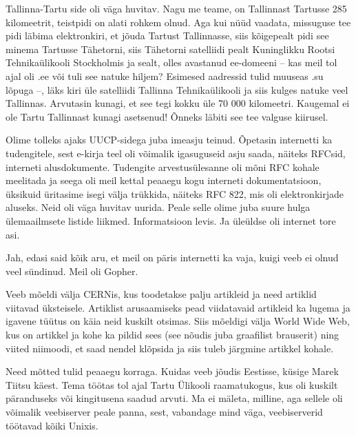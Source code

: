 Tallinna-Tartu side oli väga huvitav. Nagu me teame, on Tallinnast Tartusse 285 kilomeetrit, teistpidi on alati rohkem olnud. Aga kui 
nüüd vaadata, missuguse tee pidi läbima elektronkiri, et jõuda Tartust 
Tallinnasse, siis kõigepealt pidi see minema Tartusse Tähetorni, siis Tähetorni 
satelliidi pealt Kuninglikku Rootsi Tehnikaülikooli Stockholmis ja sealt, olles 
avastanud ee-domeeni – kas meil tol ajal oli .ee või tuli see natuke hiljem? 
Esimesed aadressid tulid muuseas .su lõpuga –, läks kiri üle satelliidi 
Tallinna Tehnikaülikooli ja siis kulges natuke veel Tallinnas. Arvutasin kunagi, et see tegi
kokku üle 70 000 kilomeetri\label{sisu!70k}. Kaugemal ei ole Tartu 
Tallinnast kunagi asetsenud! Õnneks läbiti see tee valguse kiirusel. 


Olime tolleks ajaks UUCP-sidega juba imeasju teinud. 
Õpetasin internetti ka tudengitele, sest e-kirja teel oli 
võimalik igasuguseid asju saada, näiteks RFCsid, interneti 
alusdokumente. Tudengite 
arvestusülesanne oli mõni RFC kohale meelitada ja seega oli meil kettal 
peaaegu kogu interneti dokumentatsioon, üksikuid üritasime isegi 
välja trükkida, näiteks RFC 822, mis oli elektronkirjade aluseks. Neid oli väga huvitav uurida. Peale selle olime juba suure hulga ülemaailmsete 
listide liikmed. Informatsioon levis. Ja üleüldse oli internet tore asi. 


Jah, edasi said kõik aru, et meil on päris internetti ka vaja, kuigi 
veeb ei olnud veel sündinud. Meil oli Gopher.

Veeb mõeldi välja CERNis, kus
toodetakse palju artikleid ja need artiklid viitavad üksteisele. 
Artiklist arusaamiseks pead viidatavaid artikleid ka lugema ja 
igavene tüütus on käia neid kuskilt otsimas. Siis mõeldigi välja 
World Wide Web, kus on artikkel ja kohe ka pildid sees (see nõudis 
juba graafilist brauserit) ning viited niimoodi, et saad nendel klõpsida 
ja siis tuleb järgmine artikkel kohale. 


Need mõtted tulid peaaegu korraga. Kuidas veeb jõudis Eestisse, 
küsige Marek Tiitsu käest. Tema töötas tol ajal Tartu 
Ülikooli raamatukogus, kus oli kuskilt 
päranduseks või kingitusena saadud arvuti. Ma ei mäleta, milline, aga sellele oli võimalik veebiserver peale panna, sest, 
vabandage mind väga, veebiserverid töötavad kõiki Unixis. 

